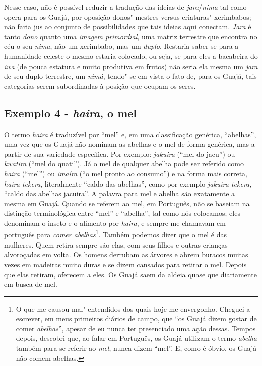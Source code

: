 Nesse caso, não é possível reduzir a tradução das ideias de
\emph{jara}/\emph{nima} tal como opera para os Guajá, por oposição
donos"-mestres versus criaturas"-xerimbabos; não faria jus ao conjunto de
possibilidades que tais ideias aqui conectam. \emph{Jara} é tanto
\emph{dono} quanto uma \emph{imagem primordial}, uma matriz terrestre
que encontra no céu o seu \emph{nima}, não um xerimbabo, mas um
\emph{duplo}. Restaria saber se para a humanidade celeste o mesmo
estaria colocado, ou seja, se para eles a bacabeira do \emph{iwa} (de
pouca estatura e muito produtiva em frutos) não seria ela mesma um
\emph{jara} de seu duplo terrestre, um \emph{nimá}, tendo"-se em vista o
fato de, para os Guajá, tais categorias serem subordinadas à posição que
ocupam os seres.

\subsection{Exemplo 4 - \emph{haira}, o mel}

O termo \emph{haira} é traduzível por ``mel'' e, em uma classificação
genérica, ``abelhas'', uma vez que os Guajá não nominam as abelhas e o mel
de forma genérica, mas a partir de sua variedade específica. Por
exemplo: \emph{jakuira} (``mel do jacu'') ou \emph{kwatira} (``mel do
quati''). Já o mel de qualquer abelha pode ser referido como \emph{haira}
(``mel'') ou \emph{imaíra} (``o mel pronto ao consumo'') e na forma mais
correta, \emph{haira tekera}, literalmente ``caldo das abelhas'', como
por exemplo \emph{jakuira tekera,} ``caldo das abelhas jacuira''. A
palavra para mel e abelha são exatamente a mesma em Guajá. Quando se
referem ao mel, em Português, não se baseiam na distinção terminológica
entre ``mel'' e ``abelha'', tal como nós colocamos; eles denominam o inseto
e o alimento por \emph{haira}, e sempre me chamavam em português para
\emph{comer abelhas}\footnote{O que me causou mal"-entendidos dos quais
  hoje me envergonho. Cheguei a escrever, em meus primeiros diários de
  campo, que ``os Guajá dizem gostar de comer \emph{abelhas}'', apesar de
  eu nunca ter presenciado uma ação dessas. Tempos depois, descobri que,
  ao falar em Português, os Guajá utilizam o termo \emph{abelha} também
  para se referir ao \emph{mel}, nunca dizem ``mel''. E, como é óbvio, os
  Guajá não comem abelhas.}. Também podemos dizer que o mel é das
mulheres. Quem retira sempre são elas, com seus filhos e outras crianças
alvoroçadas em volta. Os homens derrubam as árvores e abrem buracos
muitas vezes em madeiras muito duras e se dizem cansados para retirar o
mel. Depois que elas retiram, oferecem a eles. Os Guajá saem da aldeia
quase que diariamente em busca de mel. 

